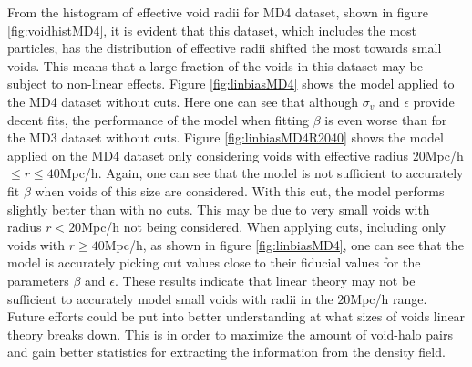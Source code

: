 From the histogram of effective void radii for MD4 dataset, shown in figure \ref{fig:voidhistMD4}, it is evident that this dataset, which includes the most particles, has the distribution of effective radii shifted the most towards small voids. This means that a large fraction of the voids in this dataset may be subject to non-linear effects. Figure \ref{fig:linbiasMD4} shows the model applied to the MD4 dataset without cuts. Here one can see that although $\sigma_v$ and $\epsilon$ provide decent fits, the performance of the model when fitting $\beta$ is even worse than for the MD3 dataset without cuts. Figure \ref{fig:linbiasMD4R2040} shows the model applied on the MD4 dataset only considering voids with effective radius $20$Mpc/h$\leq r\leq 40$Mpc/h. Again, one can see that the model is not sufficient to accurately fit $\beta$ when voids of this size are considered. With this cut, the model performs slightly better than with no cuts. This may be due to very small voids with radius $r< 20$Mpc/h not being considered. When applying cuts, including only voids with $r\geq 40$Mpc/h, as shown in figure \ref{fig:linbiasMD4}, one can see that the model is accurately picking out values close to their fiducial values for the parameters $\beta$ and $\epsilon$. These results indicate that linear theory may not be sufficient to accurately model small voids with radii in the $20$Mpc/h range. Future efforts could be put into better understanding at what sizes of voids linear theory breaks down. This is in order to maximize the amount of void-halo pairs and gain better statistics for extracting the information from the density field.

